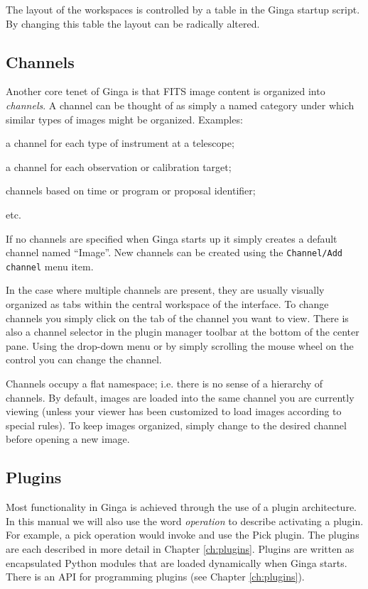 \documentclass[11pt]{report}
\begin{document}
The layout of the workspaces is controlled by a table in the Ginga
startup script.  By changing this table the layout can be radically altered.

\subsection{Channels}
Another core tenet of Ginga is that FITS image content is organized
into {\em channels}.  A channel can be thought of as simply a named
category under which similar types of images might be organized.
Examples: 
\begin{itemize*}
\item a channel for each type of instrument at a telescope;
\item a channel for each observation or calibration target;
\item channels based on time or program or proposal identifier;
\item etc.
\end{itemize*}
If no channels are specified when Ginga starts up it simply creates a
default channel named ``Image''.  New channels can be created using the
{\tt Channel/Add channel} menu item.

In the case where multiple channels are present, they are usually visually
organized as tabs within the central workspace of the interface.  To
change channels you simply click on the tab of the channel you want to
view.  There is also a channel selector in the plugin manager toolbar at
the bottom of the center pane.  Using the drop-down menu or by simply
scrolling the mouse wheel on the control you can change the channel.

Channels occupy a flat namespace; i.e. there is no sense of a hierarchy
of channels.
By default, images are loaded into the same channel you are currently
viewing (unless your viewer has been customized to load images according
to special rules).
To keep images organized, simply change to the desired channel before
opening a new image. 

\subsection{Plugins}
Most functionality in Ginga is achieved through the use of a plugin
architecture.
In this manual we will also use the word {\em operation} to describe activating
a plugin.  For example, a pick operation would invoke and use the Pick
plugin.  The plugins are each described in more detail in Chapter 
\ref{ch:plugins}.  Plugins are written as encapsulated Python modules
that are loaded dynamically when Ginga starts.  There is an API for
programming plugins (see Chapter \ref{ch:plugins}).  
\end{document}

